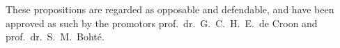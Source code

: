 \documentclass{propositions}
\begin{document}
\vspace{2.5pt}

\begin{center}
\noindent These propositions are regarded as opposable and defendable, and have been approved as such by the
promotors prof.\ dr.\ G.\ C.\ H.\ E.\ de Croon and \\prof.\ dr.\ S.\ M.\ Boht\'e.
\end{center}




















\end{document}
